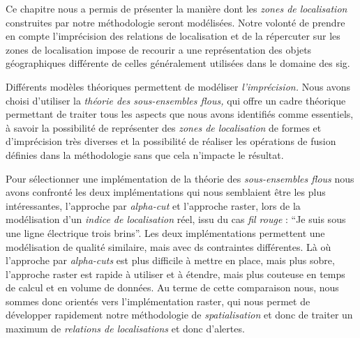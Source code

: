 Ce chapitre nous a permis de présenter la manière dont les \emph{zones
  de localisation} construites par notre méthodologie seront
modélisées. Notre volonté de prendre en compte l'imprécision des
relations de localisation et de la répercuter sur les zones de
localisation impose de recourir a une représentation des objets
géographiques différente de celles généralement utilisées dans le
domaine des \ac{sig}.

Différents modèles théoriques permettent de modéliser
\emph{l'imprécision.} Nous avons choisi d'utiliser la \emph{théorie
  des sous-ensembles flous,} qui offre un cadre théorique permettant
de traiter tous les aspects que nous avons identifiés comme
essentiels, à savoir la possibilité de représenter des \emph{zones de
  localisation} de formes et d'imprécision très diverses et la
possibilité de réaliser les opérations de fusion définies dans la
méthodologie sans que cela n'impacte le résultat.

Pour sélectionner une implémentation de la théorie des
\emph{sous-ensembles flous} nous avons confronté les deux
implémentations qui nous semblaient être les plus intéressantes,
l'approche par \emph{alpha-cut} et l'approche raster, lors de la
modélisation d'un \emph{indice de localisation} réel, issu du cas
\emph{fil rouge} : \enquote{Je suis sous une ligne électrique trois
  brins}. Les deux implémentations permettent une modélisation de
qualité similaire, mais avec ds contraintes différentes. Là où
l'approche par \emph{alpha-cuts} est plus difficile à mettre en place,
mais plus sobre, l'approche raster est rapide à utiliser et à étendre,
mais plus couteuse en temps de calcul et en volume de données. Au
terme de cette comparaison nous, nous sommes donc orientés vers
l'implémentation raster, qui nous permet de développer rapidement
notre méthodologie de \emph{spatialisation} et donc de traiter un
maximum de \emph{relations de localisations} et donc d'alertes.


